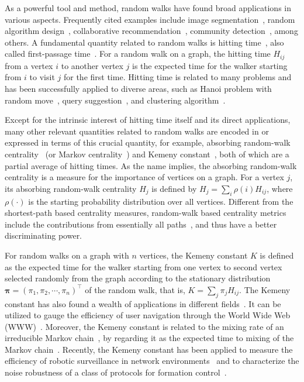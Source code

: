 \documentclass[sigconf]{acmart}
\newcommand\ppi{\boldsymbol{\pi}}
\begin{document}
As a powerful tool and method, random walks have found broad applications in various aspects. Frequently cited examples include image segmentation~\cite{Le06}, random algorithm design~\cite{SaDi12}, collaborative recommendation~\cite{FoPiReSa07}, community detection~\cite{LaDeBa14}, among others. A fundamental quantity related to random walks is hitting time~\cite{Lo93}, also called first-passage time~\cite{CoBeTeVoKl07}. For a random walk on a graph, the hitting time $H_{ij}$ from a vertex $i$ to another vertex $j$ is the expected time for the walker starting from $i$ to visit $j$ for the first time. Hitting time is related to many problems and has been successfully applied to diverse areas, such as Hanoi problem with random move~\cite{WuZhCh11}, query suggestion~\cite{MeZhCh08}, and clustering algorithm~\cite{ChLiTa08}.

Except for the intrinsic interest of hitting time itself and its direct applications, many other relevant quantities related to random walks are encoded in or expressed in terms of this crucial quantity, for example, absorbing random-walk centrality~\cite{MaMagi15} (or Markov centrality~\cite{WhSm03}) and Kemeny constant~\cite{Hu14}, both of which are a partial average of hitting times. As the name implies, the absorbing random-walk centrality is a measure for the importance of vertices on a graph. For a vertex $j$, its absorbing random-walk centrality $H_j$ is defined by $H_j=\sum_{i} \rho(i) H_{ij}$, where $\rho(\cdot)$ is the starting probability distribution over all vertices. Different from the shortest-path based centrality measures, random-walk based centrality metrics include the contributions from essentially all paths~\cite{Ne05}, and thus have a better discriminating power.

For random walks on a graph with $n$ vertices, the Kemeny constant $K$ is defined as the expected time for the walker starting from one vertex to second vertex selected randomly from the graph according to the stationary distribution $\ppi=(\pi_1, \pi_2, \cdots, \pi_n)^{\top}$ of the random walk, that is, $K=\sum_{j} \pi_j H_{ij}$. The Kemeny constant has also found a wealth of applications in different fields~\cite{Hu14}. It can be utilized to gauge the efficiency of user navigation through the World Wide Web (WWW)~\cite{LeLo02}. Moreover, the Kemeny constant is related to the mixing rate of an irreducible Markov chain~\cite{LePeWi09}, by regarding it as the expected time to mixing of the Markov chain~\cite{Hu06}. Recently, the Kemeny constant has been applied to measure the efficiency of robotic surveillance in network environments~\cite{PaAgBu15} and to characterize the noise robustness of a class of protocols for formation control~\cite{JaOl19}.
\end{document}
